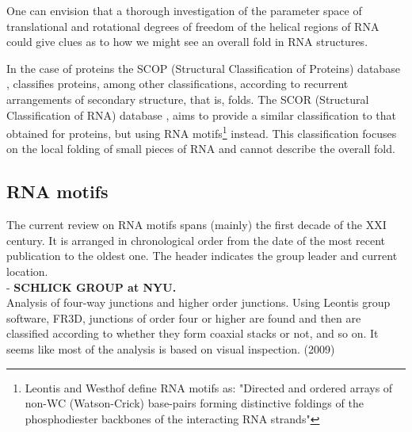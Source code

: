 One can envision that a
thorough investigation of the parameter space of translational and
rotational degrees of freedom of the helical regions of RNA could
give clues as to how we might see an overall fold in RNA structures.

In the case of proteins the SCOP (Structural Classification of
Proteins) database \cite{andreeva2004}, classifies proteins, among
other classifications, according to recurrent arrangements of
secondary structure, that is, folds. The SCOR (Structural
Classification of RNA) database \cite{klosterman2002,
klosterman2004}, aims to provide a similar classification to that
obtained for proteins, but using RNA motifs\footnote{Leontis and
Westhof \cite{leontis2003} define RNA motifs as: "Directed and
ordered arrays of non-WC (Watson-Crick) base-pairs forming
distinctive foldings of the phosphodiester backbones of the
interacting RNA strands"} instead. This classification focuses on the
local folding of small pieces of RNA and cannot
describe the overall fold.

\subsection{RNA motifs}
The current review on RNA motifs spans (mainly) the first decade of the
XXI century. It is arranged in chronological order from the date of the
most recent publication to the oldest one. The header indicates the group
leader and current location.\\

- \textbf{SCHLICK GROUP at NYU.}\\
Analysis of four-way junctions and higher order junctions.
Using Leontis group software, FR3D, junctions of order four or higher are found
and then are classified according to whether they form coaxial stacks
or not, and so on. It seems like most of the analysis is based on
visual inspection. (2009)
\cite{laing2009} \cite{laing2009a}\\

